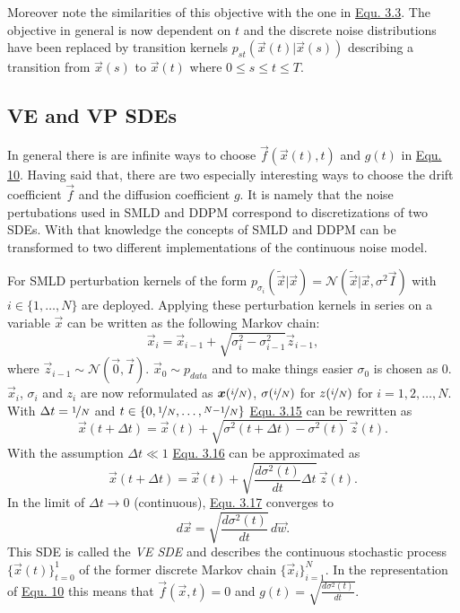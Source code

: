 Moreover note the similarities of this objective with the one in \hyperref[equ:3.3]{Equ. 3.3}. The objective in general is now dependent on $t$ and the discrete noise distributions have been replaced by transition kernels $p_{st}(\vec{x}(t)|\vec{x}(s))$ describing a transition from $\vec{x}(s)$ to $\vec{x}(t)$ where $0\leq s \leq t \leq T$.
\subsection{VE and VP SDEs} \label{sec:3.4.4}
In general there is are infinite ways to choose $\vec{f}(\vec{x}(t),t)$ and $g(t)$ in \hyperref[equ:3.10]{Equ. 10}. Having said that, there are two especially interesting ways to choose the drift coefficient $\vec{f}$ and the diffusion coefficient $g$. It is namely that the noise pertubations used in SMLD and DDPM correspond to discretizations of two SDEs. With that knowledge the concepts of SMLD and DDPM can be transformed to two different implementations of the continuous noise model.

For SMLD perturbation kernels of the form $p_{\sigma_i}(\tilde{\vec{x}}|\vec{x})=\mathcal{N}(\tilde{\vec{x}}|\vec{x},\sigma^2\vec{I})$ with $i\in\{1,\dots,N\}$ are deployed. Applying these perturbation kernels in series on a variable $\vec{x}$ can be written as the following Markov chain:
%
\begin{equation} \label{equ:3.15}
    \vec{x}_i=\vec{x}_{i-1}+\sqrt{\sigma_i^2-\sigma_{i-1}^2}\vec{z}_{i-1},
\end{equation}
%
where $\vec{z}_{i-1}\sim\mathcal{N}(\vec{0},\vec{I})$. $\vec{x}_0\sim p_{data}$ and to make things easier $\sigma_0$ is chosen as $0$. $\vec{x}_i$, $\sigma_i$ and $z_i$ are now reformulated as $\vec{x}(\nicefrac{i}{N})$, $\sigma(\nicefrac{i}{N})$ for $z(\nicefrac{i}{N})$ for $i=1,2,\dots,N$. With $\Delta t=\nicefrac{1}{N}$ and $t\in\{0,\nicefrac{1}{N},\dots,\nicefrac{N-1}{N}\}$ \hyperref[equ:3.15]{Equ. 3.15} can be rewritten as
%
\begin{equation} \label{equ:3.16}
    \vec{x}(t+\Delta t)=\vec{x}(t)+\sqrt{\sigma^2(t+\Delta t)-\sigma^2(t)}\,\vec{z}(t).
\end{equation}
%
With the assumption $\Delta t \ll 1$ \hyperref[equ:3.16]{Equ. 3.16} can be approximated as 
%
\begin{equation} \label{equ:3.17}
    \vec{x}(t+\Delta t)=\vec{x}(t)+\sqrt{\frac{d\sigma^2(t)}{dt}\Delta t}\,\vec{z}(t).
\end{equation}
%
In the limit of $\Delta t\rightarrow 0$ (continuous), \hyperref[equ:3.17]{Equ. 3.17} converges to 
%
\begin{equation} \label{equ:3.18}
    d\vec{x}=\sqrt{\frac{d\sigma^2(t)}{dt}}\,d\vec{w}.
\end{equation}
%
This SDE is called the \textit{VE SDE} and describes the continuous stochastic process $\{\vec{x}(t)\}_{t=0}^1$ of the former discrete Markov chain $\{\vec{x}_i\}_{i=1}^N$. In the representation of \hyperref[equ:3.10]{Equ. 10} this means that $\vec{f}(\vec{x},t)=0$ and $g(t)=\sqrt{\frac{d\sigma^2(t)}{dt}}$.


